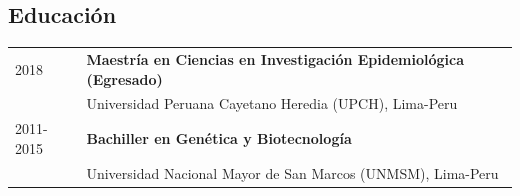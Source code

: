\documentclass[margin,line]{res}
\begin{document}
\begin{resume}
		
		
		
		\section{\sc Educación}
		
		\begin{tabular}{ l l }
			2018 & {\bf Maestría en Ciencias en Investigación Epidemiológica (Egresado)}\\
			& Universidad Peruana Cayetano Heredia (UPCH), Lima-Peru\\
			2011-2015 & {\bf Bachiller en Genética y Biotecnología}\\
			& Universidad Nacional Mayor de San Marcos (UNMSM), Lima-Peru\\
		\end{tabular}
				


\end{resume}
\end{document}
